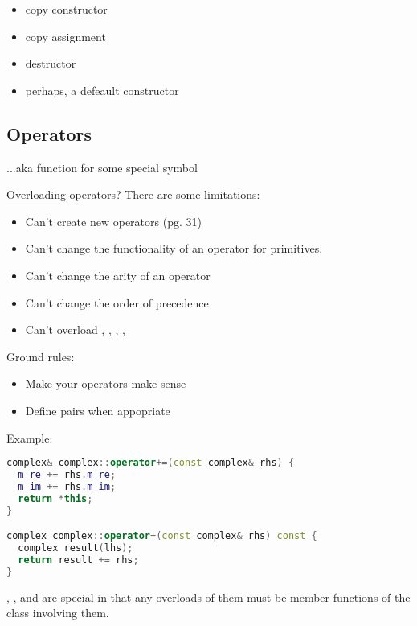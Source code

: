 \begin{itemize}
  \item copy constructor
  \item copy assignment
  \item destructor
  \item perhaps, a defeault constructor
\end{itemize}

\subsection{Operators}

...aka function for some special symbol

\underline{Overloading} operators? There are some limitations:

\begin{itemize}
  \item Can't create new operators (pg. 31)
  \item Can't change the functionality of an operator for primitives.
  \item Can't change the arity of an operator
  \item Can't change the order of precedence
  \item Can't overload \cpp{::}, , , , 
\end{itemize}

Ground rules:

\begin{itemize}
  \item Make your operators make sense
  \item Define pairs when appopriate 
\end{itemize}

Example:

\begin{lstlisting}[language=C++]
complex& complex::operator+=(const complex& rhs) {
  m_re += rhs.m_re;
  m_im += rhs.m_im;
  return *this;
}

complex complex::operator+(const complex& rhs) const {
  complex result(lhs);
  return result += rhs;
}
\end{lstlisting}

\cpp{[]}, \cpp{()}, and \cpp{=} are special in that any overloads of them must be member functions of the class involving them.